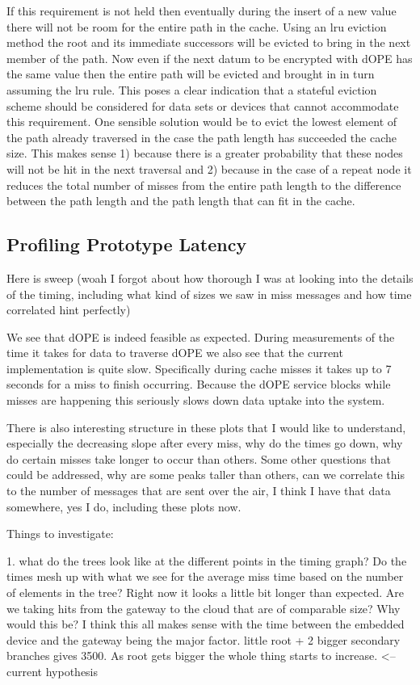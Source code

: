 \documentclass[12pt]{article}
\begin{document}
If this requirement is not held then eventually during the insert of a new value there will not be room for the entire path in the cache.  Using an lru eviction method the root and its immediate successors will be evicted to bring in the next member of the path.  Now even if the next datum to be encrypted with dOPE has the same value then the entire path will be evicted and brought in in turn assuming the lru rule.  This poses a clear indication that a stateful eviction scheme should be considered for data sets or devices that cannot accommodate  this requirement.  One sensible solution would be to evict the lowest element of the path already traversed in the case the path length has succeeded the cache size.  This makes sense 1) because there is a greater probability that these nodes will not be hit in the next traversal and 2) because in the case of a repeat node it reduces the total number of misses from the entire path length to the difference between the path length and the path length that can fit in the cache.


\subsection{Profiling Prototype Latency}


Here is sweep (woah I forgot about how thorough I was at looking into the details of the timing, including what kind of sizes we saw in miss messages and how time correlated hint perfectly)

We see that dOPE is indeed feasible as expected.  During measurements of the time it takes for data to traverse dOPE we also see that the current implementation is quite slow.  Specifically during cache misses it takes up to 7 seconds for a miss to finish occurring.  Because the dOPE service blocks while misses are happening this seriously slows down data uptake into the system.

There is also interesting structure in these plots that I would like to understand, especially the decreasing slope after every miss, why do the times go down, why do certain misses take longer to occur than others.  Some other questions that could be addressed, why are some peaks taller than others, can we correlate this to the number of messages that are sent over the air, I think I have that data somewhere, yes I do, including these plots now.

Things to investigate: 

1. what do the trees look like at the different points in the timing graph?  Do the times mesh up with what we see for the average miss time based on the number of elements in the tree?  Right now it looks a little bit longer than expected.  Are we taking hits from the gateway to the cloud that are of comparable size?  Why would this be?  I think this all makes sense with the time between the embedded device and the gateway being the major factor.  little root + 2 bigger secondary branches gives 3500.  As root gets bigger the whole thing starts to increase.  <-- current hypothesis
\end{document}
